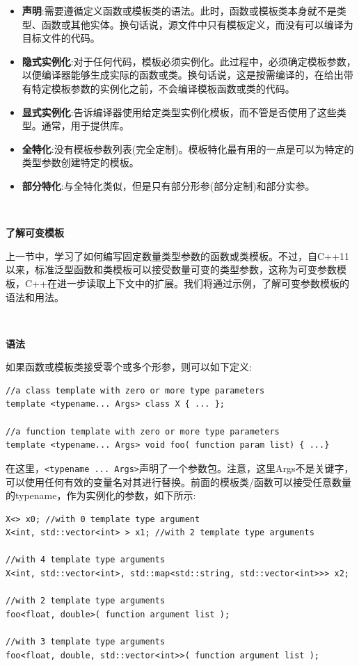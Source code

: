\begin{itemize}
	\item \textbf{声明}:需要遵循定义函数或模板类的语法。此时，函数或模板类本身就不是类型、函数或其他实体。换句话说，源文件中只有模板定义，而没有可以编译为目标文件的代码。
	\item \textbf{隐式实例化}:对于任何代码，模板必须实例化。此过程中，必须确定模板参数，以便编译器能够生成实际的函数或类。换句话说，这是按需编译的，在给出带有特定模板参数的实例化之前，不会编译模板函数或类的代码。
	\item \textbf{显式实例化}:告诉编译器使用给定类型实例化模板，而不管是否使用了这些类型。通常，用于提供库。
	\item \textbf{全特化}:没有模板参数列表(完全定制)。模板特化最有用的一点是可以为特定的类型参数创建特定的模板。
	\item \textbf{部分特化}:与全特化类似，但是只有部分形参(部分定制)和部分实参。
\end{itemize}

\noindent\textbf{}\ \par
\textbf{了解可变模板} \ \par
上一节中，学习了如何编写固定数量类型参数的函数或类模板。不过，自C++11以来，标准泛型函数和类模板可以接受数量可变的类型参数，这称为可变参数模板，C++在进一步读取上下文中的扩展。我们将通过示例，了解可变参数模板的语法和用法。 \par

\noindent\textbf{}\ \par
\textbf{语法} \ \par
如果函数或模板类接受零个或多个形参，则可以如下定义: \par

\begin{lstlisting}[caption={}]
//a class template with zero or more type parameters
template <typename... Args> class X { ... };

//a function template with zero or more type parameters
template <typename... Args> void foo( function param list) { ...}
\end{lstlisting}

在这里，\texttt{<typename ... Args>}声明了一个参数包。注意，这里Args不是关键字，可以使用任何有效的变量名对其进行替换。前面的模板类/函数可以接受任意数量的typename，作为实例化的参数，如下所示: \par

\begin{lstlisting}[caption={}]
X<> x0; //with 0 template type argument
X<int, std::vector<int> > x1; //with 2 template type arguments

//with 4 template type arguments
X<int, std::vector<int>, std::map<std::string, std::vector<int>>> x2;

//with 2 template type arguments
foo<float, double>( function argument list );

//with 3 template type arguments
foo<float, double, std::vector<int>>( function argument list );
\end{lstlisting}


